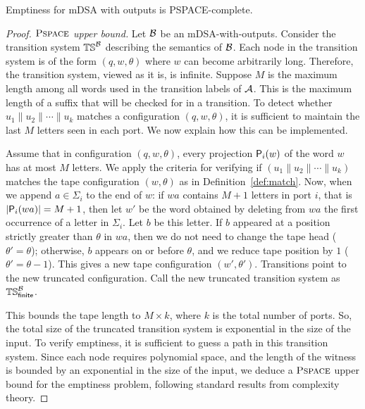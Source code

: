 
\begin{theorem}\label{thm:complexity}
Emptiness for mDSA with outputs is PSPACE-complete.
\end{theorem}
\begin{proof}
    \emph{$\operatorname{\textsc{Pspace}}$ upper bound.} Let $\mathcal{B}$ be an mDSA-with-outputs. Consider the transition system $\mathbb{TS}^{\mathcal{B}}$ describing the semantics of $\mathcal{B}$. Each node in the transition system is of the form $(q, w, \theta)$ where $w$ can become arbitrarily long. Therefore, the transition system, viewed as it is, is infinite. Suppose $M$ is the maximum length among all words used in the transition labels of $\mathcal{A}$. This is the maximum length of a suffix that will be checked for in a transition. To detect whether $u_1 \parallel u_2 \parallel \cdots \parallel u_k$ matches a configuration $(q, w, \theta)$, it is sufficient to maintain the last $M$ letters seen in each port. We now explain how this can be implemented.
    
    Assume that in configuration $(q, w, \theta)$, every projection $\mathsf{P}_{i}(w)$ of the word $w$ has at most $M$ letters. We apply the criteria for verifying if $(u_1 \parallel u_2 \parallel \cdots \parallel u_k)$ matches the tape configuration $(w, \theta)$ as in Definition~\ref{def:match}. Now, when we append $a \in \Sigma_i$ to the end of $w$: if $wa$ contains $M+1$ letters in port $i$, that is $|\mathsf{P}_{i}(wa)| = M+1$, then let $w'$ be the word obtained by deleting from $wa$ the first occurrence of a letter in $\Sigma_i$. Let $b$ be this letter. If $b$ appeared at a position strictly greater than $\theta$ in $wa$, then we do not need to change the tape head ($\theta' = \theta$); otherwise, $b$ appears on or before $\theta$, and we reduce tape position by $1$ ($\theta' = \theta - 1$). This gives a new tape configuration $(w', \theta')$. Transitions point to the new truncated configuration. Call the new truncated transition system as $\mathbb{TS}_{\mathsf{finite}}^{\mathcal{B}}$.
    
    
    This bounds the tape length to $M \times k$, where $k$ is the total number of ports. So, the total size of the truncated transition system is exponential in the size of the input. To verify emptiness, it is sufficient to guess a path in this transition system. Since each node requires polynomial space, and the length of the witness is bounded by an exponential in the size of the input, we deduce a $\operatorname{\textsc{Pspace}}$ upper bound for the emptiness problem, following standard results from complexity theory.


\end{proof}
